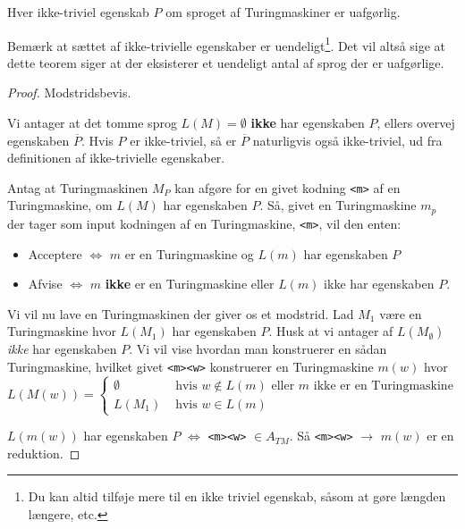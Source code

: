 \begin{theorem}
	Hver ikke-triviel egenskab $P$ om sproget af Turingmaskiner er uafgørlig.
\end{theorem}

Bemærk at sættet af ikke-trivielle egenskaber er uendeligt\footnote{Du kan altid tilføje mere til en ikke triviel egenskab, såsom at gøre længden længere, etc.}. Det vil altså sige at dette teorem siger at der eksisterer et uendeligt antal af sprog der er uafgørlige.

\begin{proof}
Modstridsbevis.

	Vi antager at det tomme sprog $L(M) = \emptyset$ \textbf{ikke} har egenskaben $P$, ellers overvej egenskaben $\overline{P}$. Hvis $P$ er ikke-triviel, så er $\overline{P}$ naturligvis også ikke-triviel, ud fra definitionen af ikke-trivielle egenskaber.


	Antag at Turingmaskinen $M_{P}$ kan afgøre for en givet kodning \texttt{<m>} af en Turingmaskine, om $L(M)$ har egenskaben $P$. Så, givet en Turingmaskine $m_{p}$ der tager som input kodningen af en Turingmaskine, \texttt{<m>}, vil den enten:
	\begin{itemize}
		\item Acceptere $\iff$  $m$ er en Turingmaskine og $L(m)$ har egenskaben $P$
		\item Afvise $\iff$ $m$ \textbf{ikke} er en Turingmaskine eller $L(m)$ ikke har egenskaben $P$.
	\end{itemize}

	Vi vil nu lave en Turingmaskinen der giver os et modstrid. Lad $M_{1}$ være en Turingmaskine hvor $L(M_{1})$ har egenskaben $P$. Husk at  vi antager af $L(M_{\emptyset})$ \textit{ikke} har egenskaben $P$. Vi vil vise hvordan man konstruerer en sådan Turingmaskine, hvilket givet \texttt{<m><w>} konstruerer en Turingmaskine $m(w)$ hvor
	\begin{equation*}
		L(M(w)) = \begin{cases}
			\emptyset & \text{ hvis } w \notin L(m) \text{ eller } m \text{ ikke er en Turingmaskine} \\
			L(M_{1})  & \text{ hvis } w \in L(m)
		\end{cases}
	\end{equation*}

	$L(m(w))$ har egenskaben $P$ $\iff$ \texttt{<m><w>} $\in A_{TM}$. Så \texttt{<m><w>} $\rightarrow$ $m(w)$ er en reduktion.
\end{proof}



